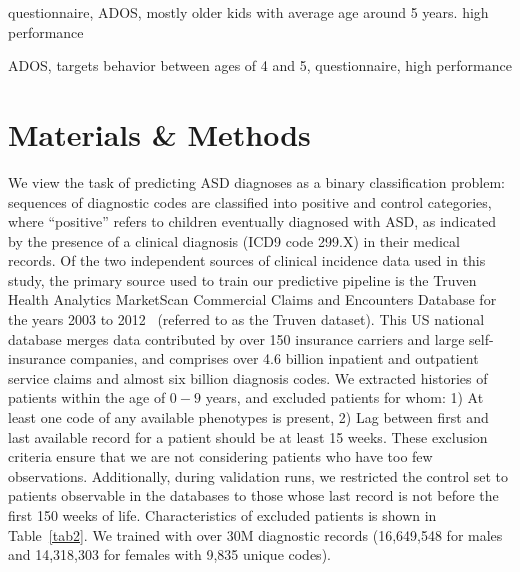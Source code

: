 \documentclass[3p,super,numbers,sort&compress,10pt]{elsarticle}
\begin{document}
\cite{wall2012use} questionnaire, ADOS, mostly older kids with average age around 5 years. high performance

\cite{wall2012use2} ADOS, targets behavior between ages of 4 and 5, questionnaire, high performance


\section*{Materials \& Methods}

We view the task of predicting  ASD diagnoses   as a binary classification problem: sequences of diagnostic codes are classified into positive and control categories, where ``positive'' refers to children eventually diagnosed with ASD, as indicated by the presence of a clinical diagnosis (ICD9 code 299.X) in their medical records. Of the two independent sources of clinical incidence data used in this study,  the primary source used to train our predictive pipeline  is the Truven Health Analytics MarketScan\textsuperscript{\textregistered} Commercial Claims and Encounters Database for the years 2003 to 2012~\cite{hansen2017truven} (referred to  as the Truven dataset). This US national database merges  data contributed by over 150 insurance carriers and large self-insurance companies,  and comprises over  4.6 billion inpatient and outpatient service claims and  almost six billion diagnosis codes. We extracted histories of patients within the age of $0-9$ years, and excluded  patients for whom:  1) At least one code of any available phenotypes is present, 2) Lag between first and last available record for a patient should be at least 15 weeks. These exclusion criteria ensure that we are not considering patients who have too few observations. Additionally, during validation runs,  we restricted the control set to patients observable in the databases to those whose last record is not before the first 150 weeks of life. Characteristics of excluded patients is shown in Table~\ref{tab2}. We trained with over  30M diagnostic records (16,649,548 for males and  14,318,303  for females with 9,835 unique  codes).
\end{document}
